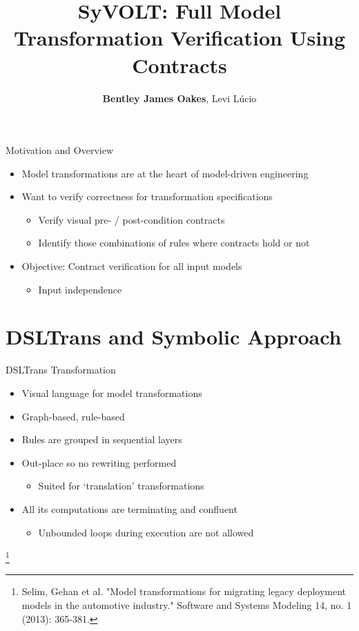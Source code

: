 \documentclass[12pt, handout]{beamer}
\title[SyVOLT]{SyVOLT: Full Model Transformation Verification Using Contracts}
\author[Oakes, Lucio]{\textbf{Bentley James Oakes}, Levi L\'{u}cio}
\institute[]{McGill University, Montreal\\fortiss, Munich}
\newcommand\blfootnote[1]{%
  \begingroup
  \renewcommand\thefootnote{}\footnote{#1}%
  \addtocounter{footnote}{-1}%
  \endgroup
}
\begin{document}
\maketitle


\begin{frame}{Motivation and Overview}
\begin{itemize}[<+->]
\item Model transformations are at the heart of model-driven engineering
\item Want to verify correctness for transformation specifications
\begin{itemize}[<+->]
\item Verify visual pre- / post-condition contracts
\item Identify those combinations of rules where contracts hold or not
\end{itemize}
\item Objective: Contract verification for all input models
\begin{itemize}
\item Input independence
\end{itemize}
\end{itemize}
\end{frame}


\section{DSLTrans and Symbolic Approach}




\begin{frame}{DSLTrans Transformation}

\begin{itemize}[<+->]
\item Visual language for model transformations

\item Graph-based, rule-based

\item Rules are grouped in sequential layers
\item Out-place so no rewriting performed
\begin{itemize}
\item Suited for `translation' transformations
\end{itemize}
\item All its computations are terminating and confluent
\begin{itemize}
\item Unbounded loops during execution are not allowed
\end{itemize}


\end{itemize}

\blfootnote{Selim, Gehan et al. "Model transformations for migrating legacy deployment models in the automotive industry." Software and Systems Modeling 14, no. 1 (2013): 365-381.}

\end{frame}
\end{document}

